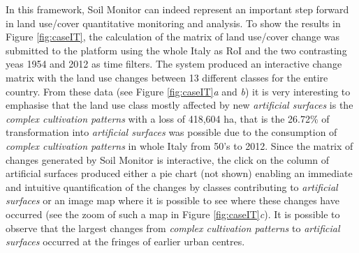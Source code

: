 \documentclass[APA,LATO1COL,doublespace]{WileyNJD-v2}
\newcommand{\update}[1]{\emph{\textcolor{blue}{#1}}}     %
\begin{document}
In this framework, Soil Monitor can indeed represent an important step forward in land use/cover quantitative monitoring and analysis.
To show the results in Figure \ref{fig:caseIT}, the calculation of the matrix of land use/cover change was submitted to the platform using the whole Italy as RoI and the two contrasting yeas 1954 and 2012 as time filters.
The system produced an interactive change matrix with the land use changes between 13 different classes for the entire country.
From these data (see Figure \ref{fig:caseIT}\textit{a} and \textit{b}) it is very interesting to emphasise that the land use class mostly affected by new \textit{artificial surfaces} is the \textit{complex cultivation patterns} with a loss of 418,604 ha, that is the 26.72\% of transformation into \textit{artificial surfaces} was possible due to the consumption of \textit{complex cultivation patterns} in whole Italy from 50's to 2012.
Since the matrix of changes generated by Soil Monitor is interactive, the click on the column of artificial surfaces produced either a pie chart (not shown) enabling an immediate and intuitive quantification of the changes by classes contributing to \textit{artificial surfaces} or an image map where it is possible to see where these changes have occurred (see the zoom of such a map in Figure \ref{fig:caseIT}\textit{c}).
It is possible to observe that the largest changes from \textit{complex cultivation patterns} to \textit{artificial surfaces} occurred at the fringes of earlier urban centres.
\end{document}
